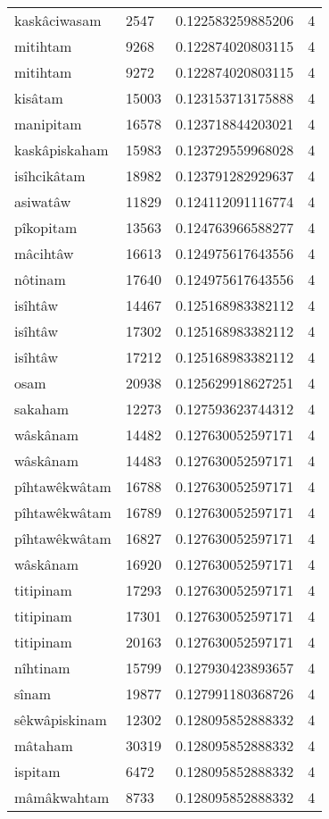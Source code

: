 \begin{longtable}{llll}
kaskâciwasam & 2547 & 0.122583259885206 & 4 \\
mitihtam & 9268 & 0.122874020803115 & 4 \\
mitihtam & 9272 & 0.122874020803115 & 4 \\
kisâtam & 15003 & 0.123153713175888 & 4 \\
manipitam & 16578 & 0.123718844203021 & 4 \\
kaskâpiskaham & 15983 & 0.123729559968028 & 4 \\
isîhcikâtam & 18982 & 0.123791282929637 & 4 \\
asiwatâw & 11829 & 0.124112091116774 & 4 \\
pîkopitam & 13563 & 0.124763966588277 & 4 \\
mâcihtâw & 16613 & 0.124975617643556 & 4 \\
nôtinam & 17640 & 0.124975617643556 & 4 \\
isîhtâw & 14467 & 0.125168983382112 & 4 \\
isîhtâw & 17302 & 0.125168983382112 & 4 \\
isîhtâw & 17212 & 0.125168983382112 & 4 \\
osam & 20938 & 0.125629918627251 & 4 \\
sakaham & 12273 & 0.127593623744312 & 4 \\
wâskânam & 14482 & 0.127630052597171 & 4 \\
wâskânam & 14483 & 0.127630052597171 & 4 \\
pîhtawêkwâtam & 16788 & 0.127630052597171 & 4 \\
pîhtawêkwâtam & 16789 & 0.127630052597171 & 4 \\
pîhtawêkwâtam & 16827 & 0.127630052597171 & 4 \\
wâskânam & 16920 & 0.127630052597171 & 4 \\
titipinam & 17293 & 0.127630052597171 & 4 \\
titipinam & 17301 & 0.127630052597171 & 4 \\
titipinam & 20163 & 0.127630052597171 & 4 \\
nîhtinam & 15799 & 0.127930423893657 & 4 \\
sînam & 19877 & 0.127991180368726 & 4 \\
sêkwâpiskinam & 12302 & 0.128095852888332 & 4 \\
mâtaham & 30319 & 0.128095852888332 & 4 \\
ispitam & 6472 & 0.128095852888332 & 4 \\
mâmâkwahtam & 8733 & 0.128095852888332 & 4 \\

\end{longtable}
